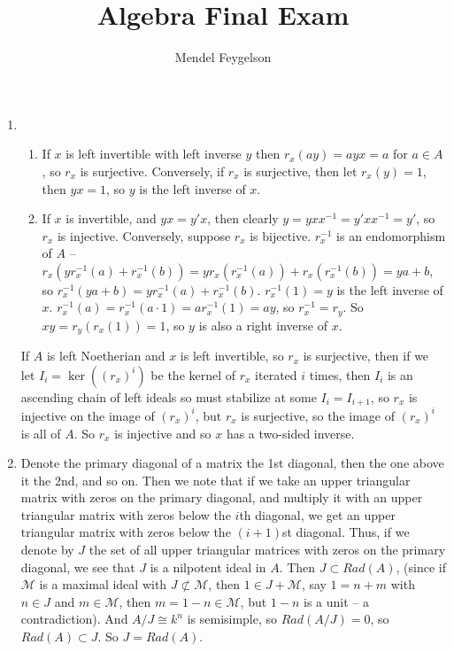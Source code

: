 \documentclass{article}
\title{Algebra Final Exam}
\author{Mendel Feygelson}
\newcommand\M{\mathscr M}
\begin{document}
\maketitle
\begin{enumerate}

   \item \begin{enumerate}
         \item If $x$ is left invertible with left inverse $y$ then
            $r_x(ay)=ayx=a$ for $a \in A$, so $r_x$ is surjective. Conversely,
            if $r_x$ is surjective, then let $r_x(y) = 1$, then $yx = 1$, so $y$
            is the left inverse of $x$.
         \item If $x$ is invertible, and $yx = y'x$, then clearly $y = yxx^{-1}
            = y'xx^{-1} = y'$, so $r_x$ is injective. Conversely, suppose $r_x$
            is bijective. $r_x^{-1}$ is an endomorphism of $A$ --
            $r_x(yr_x^{-1}(a) + r_x^{-1}(b)) = yr_x(r_x^{-1}(a)) +
            r_x(r_x^{-1}(b)) = ya + b$, so $r_x^{-1}(ya+b) =
            yr_x^{-1}(a)+r_x^{-1}(b)$. $r_x^{-1}(1) = y$ is the left inverse of
            $x$. $r_x^{-1}(a) = r_x^{-1}(a\cdot1) = ar_x^{-1}(1) = ay$, so
            $r_x^{-1} = r_y$. So $xy = r_y(r_x(1)) = 1$, so $y$ is also a right
            inverse of $x$.
      \end{enumerate}
      If $A$ is left Noetherian and $x$ is left invertible, so $r_x$ is
      surjective, then if we let $I_i = \ker( (r_x)^i)$ be the kernel of $r_x$
      iterated $i$ times, then $I_i$ is an ascending chain of left ideals so
      must stabilize at some $I_i = I_{i+1}$, so $r_x$ is injective on the image
      of $(r_x)^i$, but $r_x$ is surjective, so the image of $(r_x)^i$ is all of
      $A$. So $r_x$ is injective and so $x$ has a two-sided inverse.

   \item Denote the primary diagonal of a matrix the 1st diagonal, then the one
      above it the 2nd, and so on. Then we note that if we take an upper
      triangular matrix with zeros on the primary diagonal, and multiply it with
      an upper triangular matrix with zeros below the $i$th diagonal, we get an
      upper triangular matrix with zeros below the $(i+1)$st diagonal. Thus, if
      we denote by $J$ the set of all upper triangular matrices with zeros on
      the primary diagonal, we see that $J$ is a nilpotent ideal in $A$. Then $J
      \subset Rad(A)$, (since if $\M$ is a maximal ideal with $J \not\subset \M$,
      then $1 \in J + \M$, say $1 = n + m$ with $n \in J$ and $m \in \M$, then
      $m = 1 - n \in \M$, but $1 - n$ is a unit -- a contradiction). And $A/J
      \cong k^n$ is semisimple, so $Rad(A/J) = 0$, so $Rad(A) \subset J$. So $J
      = Rad(A)$.


\end{enumerate}
\end{document}

